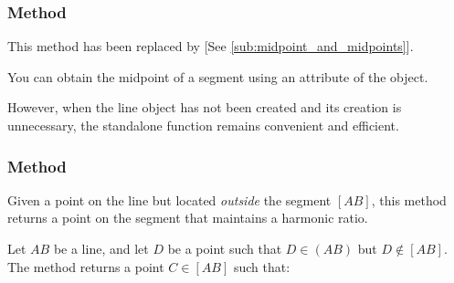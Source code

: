 \begin{minipage}{.5\textwidth}
\begin{center}
\end{center}
\end{minipage}
\begin{minipage}{.5\textwidth}
\begin{tkzexample}
\end{tkzexample}
\end{minipage}

\subsubsection{Method }
\label{ssub:method_line_midpoint}

This method has been replaced by  [See \ref{sub:midpoint_and_midpoints}].

You can obtain the midpoint of a segment using an attribute of the  object.

\begin{center}
\end{center}

\medskip

However, when the line object has not been created and its creation is unnecessary, the standalone function  remains convenient and efficient.


\subsubsection{Method }
\label{ssub:method_line_harmonic_int}

Given a point on the line but located \emph{outside} the segment $[AB]$, this method returns a point on the segment that maintains a harmonic ratio.

\medskip

Let $AB$ be a line, and let $D$ be a point such that $D \in (AB)$ but $D \not\in [AB]$. The method returns a point $C \in [AB]$ such that:


